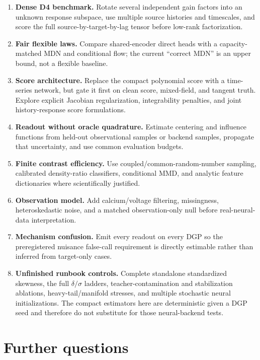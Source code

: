 \documentclass[11pt]{article}
\begin{document}
\begin{enumerate}
\item \textbf{Dense D4 benchmark.}  Rotate several independent gain factors into an
unknown response subspace, use multiple source histories and timescales, and score
the full source-by-target-by-lag tensor before low-rank factorization.
\item \textbf{Fair flexible laws.}  Compare shared-encoder direct heads with a
capacity-matched MDN and conditional flow; the current ``correct MDN'' is an upper
bound, not a flexible baseline.
\item \textbf{Score architecture.}  Replace the compact polynomial score with a
time-series network, but gate it first on clean score, mixed-field, and tangent
truth.  Explore explicit Jacobian regularization, integrability penalties, and
joint history-response score formulations.
\item \textbf{Readout without oracle quadrature.}  Estimate centering and influence
functions from held-out observational samples or backend samples, propagate that
uncertainty, and use common evaluation budgets.
\item \textbf{Finite contrast efficiency.}  Use coupled/common-random-number
sampling, calibrated density-ratio classifiers, conditional MMD, and analytic
feature dictionaries where scientifically justified.
\item \textbf{Observation model.}  Add calcium/voltage filtering, missingness,
heteroskedastic noise, and a matched observation-only null before real-neural-data
interpretation.
\item \textbf{Mechanism confusion.}  Emit every readout on every DGP so the
preregistered nuisance false-call requirement is directly estimable rather than
inferred from target-only cases.
\item \textbf{Unfinished runbook controls.}  Complete standalone standardized
skewness, the full $\delta/\sigma$ ladders, teacher-contamination and stabilization
ablations, heavy-tail/manifold stresses, and multiple stochastic neural
initializations.  The compact estimators here are deterministic given a DGP seed
and therefore do not substitute for those neural-backend tests.
\end{enumerate}

\section*{Further questions}
\end{document}
